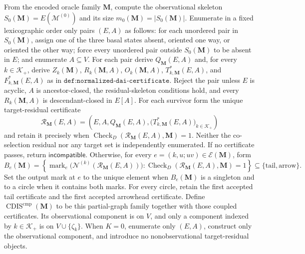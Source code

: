 From the encoded oracle family \(\mathbf M\), compute the observational skeleton \(S_0(\mathbf M)=E(\mathcal M^{(0)})\) and its size \(m_0(\mathbf M)=|S_0(\mathbf M)|\).  Enumerate in a fixed lexicographic order only pairs \((E,A)\) as follows: for each unordered pair in \(S_0(\mathbf M)\), assign one of the three basal states absent, oriented one way, or oriented the other way; force every unordered pair outside \(S_0(\mathbf M)\) to be absent in \(E\); and enumerate \(A\subseteq V\).  For each pair derive \(Q_{\mathbf M}(E,A)\) and, for every \(k\in\mathcal K_+\), derive \(Z_k(\mathbf M)\), \(R_k(\mathbf M,A)\), \(O_k(\mathbf M,A)\), \(T^*_{k,\mathbf M}(E,A)\), and \(F^*_{k,\mathbf M}(E,A)\) as in \(\texttt{def:normalized-dai-certificate}\).  Reject the pair unless \(E\) is acyclic, \(A\) is ancestor-closed, the residual-skeleton conditions hold, and every \(R_k(\mathbf M,A)\) is descendant-closed in \(E[A]\).  For each survivor form the unique target-residual certificate
\[
\mathcal R_{\mathbf M}(E,A)=
\left(E,A,Q_{\mathbf M}(E,A),
\bigl(T^*_{k,\mathbf M}(E,A)\bigr)_{k\in\mathcal K_+}\right)
\]
and retain it precisely when \(\operatorname{Check}_{D}(\mathcal R_{\mathbf M}(E,A),\mathbf M)=1\).  Neither the co-selection residual nor any target set is independently enumerated.  If no certificate passes, return \(\mathsf{incompatible}\).  Otherwise, for every \(e=(k,u;uv)\in\mathcal E(\mathbf M)\), form
\[
B_e(\mathbf M)=\left\{\operatorname{mark}_e\bigl(\mathcal N^{(k)}(\mathcal R_{\mathbf M}(E,A))\bigr):
\operatorname{Check}_{D}(\mathcal R_{\mathbf M}(E,A),\mathbf M)=1\right\}
\subseteq\{\mathrm{tail},\mathrm{arrow}\}.
\]
Set the output mark at \(e\) to the unique element when \(B_e(\mathbf M)\) is a singleton and to a circle when it contains both marks.  For every circle, retain the first accepted tail certificate and the first accepted arrowhead certificate.  Define \(\operatorname{CDIS}^{\mathrm{cmp}}(\mathbf M)\) to be this partial-graph family together with those coupled certificates.  Its observational component is on \(V\), and only a component indexed by \(k\in\mathcal K_+\) is on \(V\cup\{\zeta_k\}\).  When \(K=0\), enumerate only \((E,A)\), construct only the observational component, and introduce no nonobservational target-residual objects.